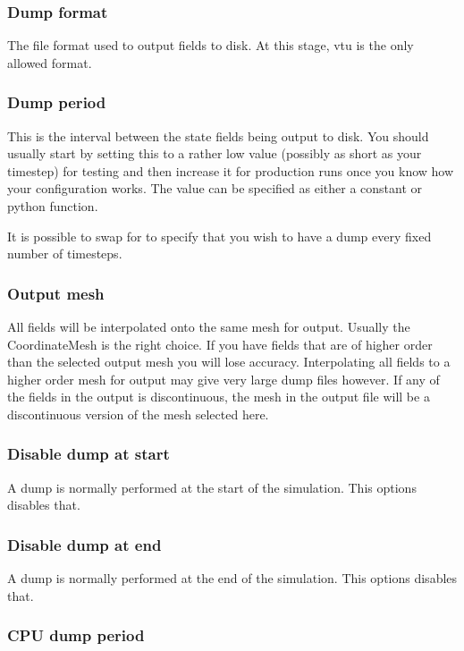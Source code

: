\subsubsection{Dump format}
The file format used to output fields to disk. At this stage, vtu is the
only allowed format.

\subsubsection{Dump period}
This is the interval between the state fields being output to disk. You should usually start by setting this to a rather low value (possibly as short as your timestep) for testing and then increase it for production runs once you know how your configuration works. The value can be specified as either a constant or python function.

It is possible to swap  for  to specify that you wish to have a dump every fixed number of timesteps.

\subsubsection{Output mesh}

All fields will be interpolated onto the same mesh for output. Usually the
CoordinateMesh is the right choice. If you have fields that are of
higher order than the selected output mesh you will lose
accuracy. Interpolating all fields to a higher order mesh for output may give
very large dump files however. If any
of the fields in the output is discontinuous, the mesh in the output file
will be a discontinuous version of the mesh selected here.

\subsubsection{Disable dump at start}

A dump is normally performed at the start of the simulation. This options disables that.

\subsubsection{Disable dump at end}

A dump is normally performed at the end of the simulation. This options disables that.

\subsubsection{CPU dump period}

